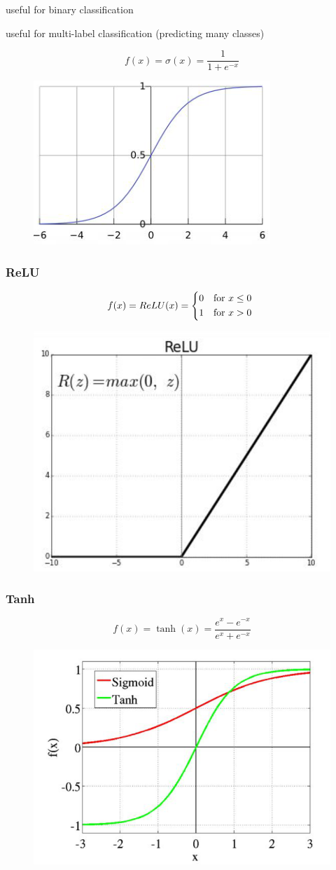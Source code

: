 \documentclass[11pt]{article}
\begin{document}
useful for binary classification

useful for multi-label classification (predicting many classes)

\begin{equation}
    f(x)=\sigma(x)=\frac{1}{1 + e^{-x}}
\end{equation}

\begin{figure}[H]
    \centering
    \includegraphics*[width=.3\linewidth]{images/sigmoid.png}
\end{figure}

\subsubsection{ReLU}

\begin{equation}
    f(x)=ReLU(x)=\begin{dcases*}
        0 & for $x \leq 0$ \\ 1 & for $x > 0$
    \end{dcases*}
\end{equation}

\begin{figure}[H]
    \centering
    \includegraphics*[width=.3\linewidth]{images/relu.png}
\end{figure}

\subsubsection{Tanh}

\begin{equation}
    f(x)=\tanh(x)=\frac{e^x - e^{-x}}{e^x + e^{-x}}
\end{equation}

\begin{figure}[H]
    \centering
    \includegraphics*[width=.3\linewidth]{images/tanh.png}
\end{figure}
\end{document}
